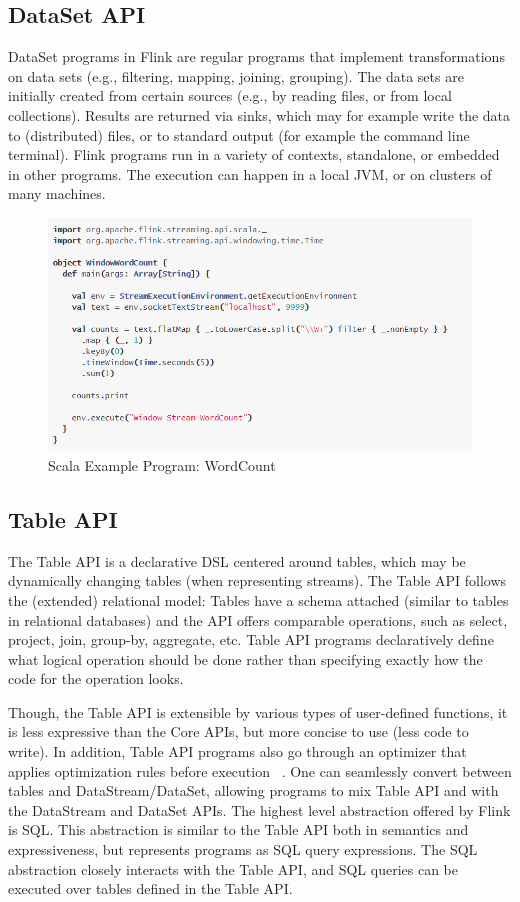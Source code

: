 \documentclass[9pt,twocolumn,twoside]{../../styles/osajnl}
\begin{document}
\subsection{DataSet API}

DataSet programs in Flink are regular programs that implement transformations on data sets (e.g., filtering, mapping, joining, grouping). The data sets are initially created from certain sources (e.g., by reading files, or from local collections).
Results are returned via sinks, which may for example write the data to (distributed) files, or to standard output (for example the command line terminal). Flink programs run in a variety of contexts, standalone, or embedded in other programs. The execution can happen in a local JVM, or on clusters of many machines.

\begin{figure}[H]
 \centering
\includegraphics[scale=0.5]{images/image8}
\caption{Scala Example Program: WordCount  ~\cite{www-flink}}
\end{figure}

\subsection{ Table API}

The Table API is a declarative DSL centered around tables, which may be dynamically changing tables (when representing streams). The Table API follows the (extended) relational model: Tables have a schema attached (similar to tables in relational databases) and the API offers comparable operations, such as select, project, join, group-by, aggregate, etc. Table API programs declaratively define what logical operation should be done rather than specifying exactly how the code for the operation looks.

Though, the Table API is extensible by various types of user-defined functions, it is less expressive than the Core APIs, but more concise to use (less code to write). In addition, Table API programs also go through an optimizer that applies optimization rules before execution ~\cite{article-flink}. One can seamlessly convert between tables and DataStream/DataSet, allowing programs to mix Table API and with the DataStream and DataSet APIs. The highest level abstraction offered by Flink is SQL. This abstraction is similar to the Table API both in semantics and expressiveness, but represents programs as SQL query expressions. The SQL abstraction closely interacts with the Table API, and SQL queries can be executed over tables defined in the Table API.
\end{document}

